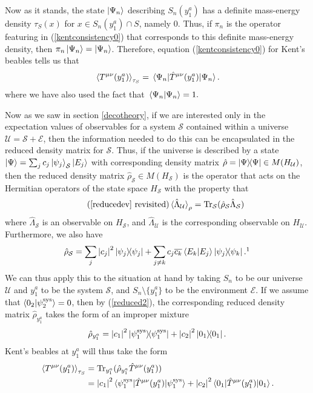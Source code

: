 Now as it stands, the state $\ket{\Psi_n}$ describing $S_n(y^a_1)$ has a definite mass-energy density $\tau_S(x)$ for $x\in S_n(y^a_1)\cap S$, namely $0$. Thus, if $\pi_n$ is the operator featuring in (\ref{kentconsistency0}) that corresponds to this definite mass-energy density, then $\pi_n\ket{\Psi_n}=\ket{\Psi_n}$. Therefore, equation (\ref{kentconsistency0}) for Kent's beables tells us that
$$\ev*{T^{\mu\nu}(y^a_1)}_{\tau_S}=\ev*{\hat{T}^{\mu\nu}(y^a_1)}{\Psi_n}.$$ 
where we have also used the fact that $\ip*{\Psi_n}{\Psi_n}=1.$

Now as we saw in section \ref{decotheory}, if we are interested only in the expectation values of observables for a system $\mathcal{S}$ contained within a universe $\mathcal{U}=\mathcal{S}+\mathcal{E}$, then the information needed to do this can be encapsulated in the reduced density matrix for $\mathcal{S}$. Thus, if the universe is described by a state 
$\ket{\Psi}=\sum_j c_j \ket{\psi_j}_\mathcal{S}\ket{E_j}$ with corresponding density matrix $\hat{\rho}=\dyad{\Psi}\in M(H_\mathcal{U})$, then the reduced density matrix $\hat{\rho}_\mathcal{S}\in M(H_\mathcal{S})$ is the operator that acts on the Hermitian operators of the state space $H_\mathcal{S}$ with the property that 
\begin{equation}\tag{\ref{reducedev} revisited}
\ev*{\hat{\Lambda}_\mathcal{U}}_\rho=\Tr_\mathcal{S}(\hat{\rho}_\mathcal{S}\hat{\Lambda}_\mathcal{S})
\end{equation}
where $\hat{\Lambda}_\mathcal{S}$ is an observable on $H_\mathcal{S}$,  and $\hat{\Lambda}_\mathcal{U}$ is the corresponding observable on $H_\mathcal{U}$. Furthermore, we also have
\begin{equation}\label{reduced2}
\hat{\rho}_\mathcal{S}=\sum_j \abs{c_j}^2\dyad{\psi_j}+\sum_{j\neq k} c_j\overline{c_k}\ip{E_k}{E_j}\dyad{\psi_j}{\psi_k}.\protect\footnotemark
\end{equation}
We can thus apply this to the situation at hand by taking $S_n$ to be our universe $\mathcal{U}$ and $y^a_1$ to be the system $\mathcal{S}$, and $S_n\setminus \{y^a_1\}$ to be the environment $\mathcal{E}$. If we assume that $\ip{0_2}{\psi_2^\text{sys}}= 0$, then by (\ref{reduced2}), the corresponding reduced density matrix $\hat{\rho}_{y^a_1}$ takes the form of an improper mixture
\begin{equation}\label{kentred}
\hat{\rho}_{y^a_1}= \abs{c_1}^2\dyad{\psi_1^\text{sys}}+\abs{c_2}^2\dyad{0_1}.
\end{equation}
Kent's beables at $y^a_1$ will thus take the form 
\begin{equation}\label{kentbe}
\begin{split}
\ev*{T^{\mu\nu}(y^a_1)}_{\tau_S}&=\Tr_{y^a_1}(\hat{\rho}_{y^a_1}\hat{T}^{\mu\nu}(y^a_1))\\
&=\abs{c_1}^2\ev*{\hat{T}^{\mu\nu}(y^a_1)}{\psi_1^\text{sys}}+\abs{c_2}^2\ev*{\hat{T}^{\mu\nu}(y^a_1)}{0_1}.
\end{split}
\end{equation}

